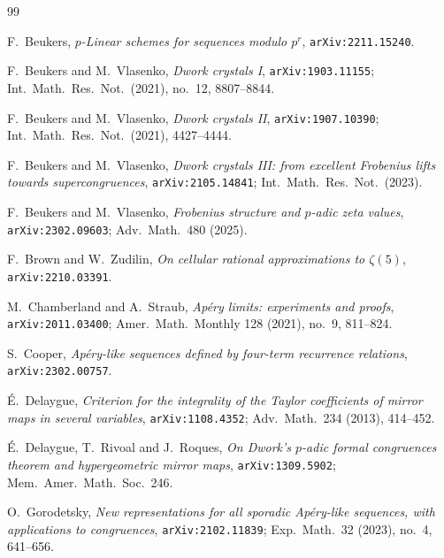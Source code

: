 %

\begin{thebibliography}{99}

F.~Beukers,
\emph{$p$-Linear schemes for sequences modulo $p^r$},
\texttt{arXiv:2211.15240}.

F.~Beukers and M.~Vlasenko,
\emph{Dwork crystals I},
\texttt{arXiv:1903.11155}; Int.\ Math.\ Res.\ Not.\ (2021), no.~12, 8807--8844.

F.~Beukers and M.~Vlasenko,
\emph{Dwork crystals II},
\texttt{arXiv:1907.10390}; Int.\ Math.\ Res.\ Not.\ (2021), 4427--4444.

F.~Beukers and M.~Vlasenko,
\emph{Dwork crystals III: from excellent Frobenius lifts towards
supercongruences},
\texttt{arXiv:2105.14841}; Int.\ Math.\ Res.\ Not.\ (2023).

F.~Beukers and M.~Vlasenko,
\emph{Frobenius structure and $p$-adic zeta values},
\texttt{arXiv:2302.09603}; Adv.\ Math.\ 480 (2025).

F.~Brown and W.~Zudilin,
\emph{On cellular rational approximations to $\zeta(5)$},
\texttt{arXiv:2210.03391}.

M.~Chamberland and A.~Straub,
\emph{Ap\'ery limits: experiments and proofs},
\texttt{arXiv:2011.03400}; Amer.\ Math.\ Monthly 128 (2021), no.~9, 811--824.

S.~Cooper,
\emph{Ap\'ery-like sequences defined by four-term recurrence relations},
\texttt{arXiv:2302.00757}.

\'E.~Delaygue,
\emph{Criterion for the integrality of the Taylor coefficients of mirror maps in several
variables},
\texttt{arXiv:1108.4352}; Adv.\ Math.\ 234 (2013), 414--452.

\'E.~Delaygue, T.~Rivoal and J.~Roques,
\emph{On Dwork's $p$-adic formal congruences theorem and hypergeometric mirror maps},
\texttt{arXiv:1309.5902}; Mem.\ Amer.\ Math.\ Soc.\ 246.

O.~Gorodetsky,
\emph{New representations for all sporadic Ap\'ery-like sequences, with applications to
congruences},
\texttt{arXiv:2102.11839}; Exp.\ Math.\ 32 (2023), no.~4, 641--656.


\end{thebibliography}
